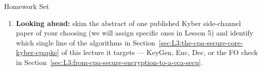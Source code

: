 \begin{exercisebox}{Homework Set}
\begin{enumerate}[leftmargin=*]
  \item \textbf{Looking ahead:} skim the abstract of one published Kyber side-channel paper of your choosing (we will assign specific ones in Lesson 5) and identify which single line of the algorithms in Section~\ref{sec:L3:the-cpa-secure-core-kyber-cpapke} of this lecture it targets --- KeyGen, Enc, Dec, or the FO check in Section~\ref{sec:L3:from-cpa-secure-encryption-to-a-cca-secu}.
\end{enumerate}
\end{exercisebox}
